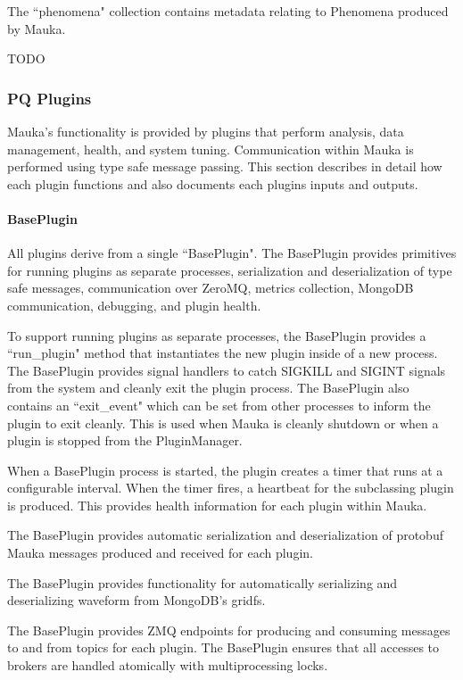 The ``phenomena" collection contains metadata relating to Phenomena produced by Mauka.

TODO

\subsubsection{PQ Plugins}
Mauka's functionality is provided by plugins that perform analysis, data management, health, and system tuning. Communication within Mauka is performed using type safe message passing. This section describes in detail how each plugin functions and also documents each plugins inputs and outputs.

\paragraph{BasePlugin}
All plugins derive from a single ``BasePlugin". The BasePlugin provides primitives for running plugins as separate processes, serialization and deserialization of type safe messages, communication over ZeroMQ, metrics collection, MongoDB communication, debugging, and plugin health.

To support running plugins as separate processes, the BasePlugin provides a ``run\_plugin" method that instantiates the new plugin inside of a new process. The BasePlugin provides signal handlers to catch SIGKILL and SIGINT signals from the system and cleanly exit the plugin process. The BasePlugin also contains an ``exit\_event" which can be set from other processes to inform the plugin to exit cleanly. This is used when Mauka is cleanly shutdown or when a plugin is stopped from the PluginManager.

When a BasePlugin process is started, the plugin creates a timer that runs at a configurable interval. When the timer fires, a heartbeat for the subclassing plugin is produced. This provides health information for each plugin within Mauka.

The BasePlugin provides automatic serialization and deserialization of protobuf Mauka messages produced and received for each plugin.

The BasePlugin provides functionality for automatically serializing and deserializing waveform from MongoDB's gridfs.

The BasePlugin provides ZMQ endpoints for producing and consuming messages to and from topics for each plugin. The BasePlugin ensures that all accesses to brokers are handled atomically with multiprocessing locks.

